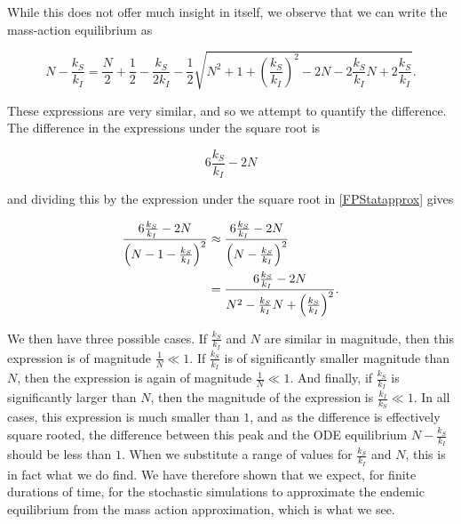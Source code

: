 \documentclass[12pt,a4paper,openany,twoside]{book}
\begin{document}
While this does not offer much insight in itself, we observe that we can write the mass-action equilibrium as

\begin{equation}
	N - \frac {k_S} {k_I} = \frac N 2 + \frac 1 2 - \frac {k_S} {2 k_I} - \frac {1} {2} \sqrt{N^2 + 1 + \left( \frac {k_S} {k_I} \right)^2 - 2 N - 2 \frac {k_S} {k_I} N + 2 \frac {k_S} {k_I}}. \label{FPStatapprox}
\end{equation}

These expressions are very similar, and so we attempt to quantify the difference. The difference in the expressions under the square root is

\begin{equation}
	6 \frac {k_S} {k_I} - 2N
\end{equation}

and dividing this by the expression under the square root in \ref{FPStatapprox} gives

\begin{align}
	\frac {6 \frac {k_S} {k_I} - 2N} {\left( N - 1 - \frac {k_S} {k_I} \right)^2} &\approx \frac {6 \frac {k_S} {k_I} - 2N} {\left(N - \frac {k_S} {k_I} \right)^2} \notag \\
	&= \frac {6 \frac {k_S} {k_I} - 2N} {N^2 - \frac {k_S} {k_I} N + \left( \frac {k_S} {k_I} \right)^2}.
\end{align}

We then have three possible cases. If $\frac {k_S} {k_I}$ and $N$ are similar in magnitude, then this expression is of magnitude $\frac 1 N \ll 1$. If $\frac {k_S} {k_I}$ is of significantly smaller magnitude than $N$, then the expression is again of magnitude $\frac 1 N \ll 1$. And finally, if $\frac {k_S} {k_I}$ is significantly larger than $N$, then the magnitude of the expression is $\frac {k_I} {k_S} \ll 1$. In all cases, this expression is much smaller than $1$, and as the difference is effectively square rooted, the difference between this peak and the ODE equilibrium $N - \frac {k_S} {k_I}$ should be less than $1$. When we substitute a range of values for $\frac {k_S} {k_I}$ and $N$, this is in fact what we do find. We have therefore shown that we expect, for finite durations of time, for the stochastic simulations to approximate the endemic equilibrium from the mass action approximation, which is what we see.
\end{document}
